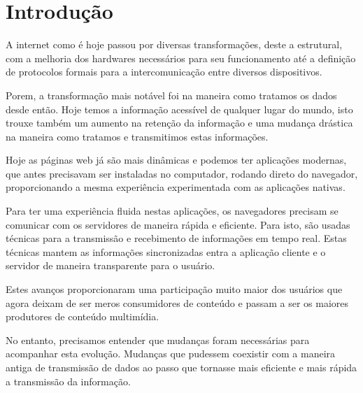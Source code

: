\section{Introdução}


A internet como é hoje passou por diversas transformações, deste a estrutural, com a melhoria dos hardwares necessários para seu funcionamento até a definição de protocolos formais para a intercomunicação entre diversos dispositivos.

Porem, a transformação mais notável foi na maneira como tratamos os dados desde então. Hoje temos a informação acessível de qualquer lugar do mundo, isto trouxe também um aumento na retenção da informação e uma mudança drástica na maneira como tratamos e transmitimos estas informações.

Hoje as páginas web já são mais dinâmicas e podemos ter aplicações modernas, que antes precisavam ser instaladas no computador, rodando direto do navegador,  proporcionando a mesma experiência experimentada com as aplicações nativas.

Para ter uma experiência fluida nestas aplicações, os navegadores precisam se comunicar com os servidores de maneira rápida e eficiente. Para isto, são usadas técnicas para a transmissão e recebimento de informações em tempo real. Estas técnicas mantem as informações sincronizadas entra a aplicação cliente e o servidor de maneira transparente para o usuário.

Estes avanços proporcionaram uma participação muito maior dos usuários que agora deixam de ser meros consumidores de conteúdo e passam a ser os maiores produtores de conteúdo multimídia.

No entanto, precisamos entender que mudanças foram necessárias para acompanhar esta evolução. Mudanças que pudessem coexistir com a maneira antiga de transmissão de dados ao passo que tornasse mais eficiente e mais rápida a transmissão da informação.


